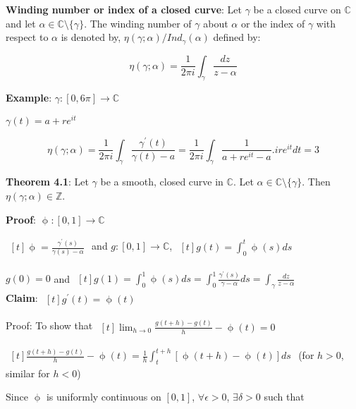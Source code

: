 \documentclass{article}
\begin{document}
\begin{flushleft}
\textbf{Winding number or index of a closed curve}:
Let $\gamma$ be a closed curve on $\mathds{C}$ and let $\alpha \in \mathds{C}\setminus \{\gamma\}$. The winding number of $\gamma$ about $\alpha$ or the index of $\gamma$ with respect to $\alpha$ is denoted by,
$\eta(\gamma;\alpha)/Ind_{\gamma}(\alpha)$ defined by:

$$\eta(\gamma;\alpha)=\frac{1}{2\pi i}\int_{\gamma}^{}\frac{dz}{z-\alpha}$$

\textbf{Example}: $\gamma: [0,6\pi]\rightarrow \mathds{C}$ 

$\gamma(t)=a+re^{it}$ 

$$\eta(\gamma;\alpha)=\frac{1}{2\pi i}\int_{\gamma}^{} \frac{\gamma^{'}(t)}{\gamma(t)-a}=\frac{1}{2\pi i}\int_{\gamma}^{} \frac{1}{a+re^{it}-a}.ire^{it} dt=3$$

\textbf{Theorem 4.1}: Let $\gamma$ be a smooth, closed curve in $\mathds{C}$. Let $\alpha\in \mathds{C}\setminus \{\gamma\}$. Then $\eta(\gamma;\alpha)\in \mathds{Z}$.

\textbf{Proof}: $\upphi:[0,1] \rightarrow \mathds{C}$

$\begin{aligned}[t] \upphi= \frac{\gamma^{'}(s)}{\gamma(s)-\alpha} \end{aligned}$ and $g:[0,1]\rightarrow \mathds{C}$, $\begin{aligned}[t]g(t)=\int_{0}^{t} \upphi(s) ds\end{aligned}$

$g(0)=0$ and $\begin{aligned}[t] g(1)=\int_{0}^{1} \upphi(s) ds= \int_{0}^{1} \frac{\gamma^{'}(s)}{\gamma-\alpha} ds= \int_{\gamma}^{} \frac{dz}{z-\alpha} \end{aligned}$\\
\vspace{2mm}
\textbf{Claim}: $\begin{aligned}[t] g^{'}(t)=\upphi(t) \end{aligned}$

Proof: To show that $\begin{aligned}[t] \lim_{h \to 0}\frac{g(t+h)-g(t)}{h}-\upphi(t)=0 \end{aligned}$

$\begin{aligned}[t] \frac{g(t+h)-g(t)}{h}-\upphi(t)=\frac{1}{h}\int_{t}^{t+h}[\upphi(t+h)-\upphi(t)] ds \end{aligned}$ \:(for $h>0$, similar for $h<0$)

Since $\upphi$ is uniformly continuous on $[0,1]$, $\forall \epsilon >0$, $\exists \delta>0$ such that 


\end{flushleft}
\end{document}
